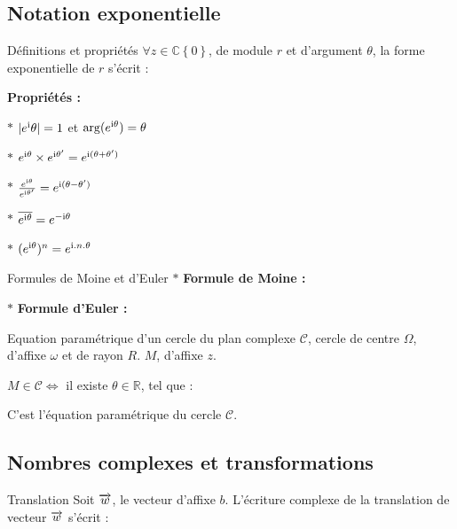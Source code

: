 \subsection{Notation exponentielle}

\begin{bclogo}{Définitions et propriétés}
$\forall z \in \mathbb{C} \left\lbrace 0\right\rbrace $, de module $r$ et d'argument $\theta$, la forme exponentielle de $r$ s'écrit :

\textbf{Propriétés :}

$\ast$ $|e^{\mathrm{i}} \theta|=1$ et $\arg (e^{\mathrm{i} \theta} )=\theta$
\medskip

$\ast$ $e^{\mathrm{i} \theta}\times e^{\mathrm{i} \theta '}=e^{\mathrm{i} (\theta +\theta ')}$
\medskip

$\ast$ $\frac{e^{\mathrm{i} \theta}}{e^{\mathrm{i} \theta '}}=e^{\mathrm{i} (\theta-\theta ')}$
\medskip

$\ast$ $\overline{e^{\mathrm{i} \theta}}=e^{-\mathrm{i} \theta}$
\medskip

$\ast$ $(e^{\mathrm{i} \theta})^n=e^{\mathrm{i} .n.\theta}$

\end{bclogo} 

\medskip

\begin{bclogo}{Formules de Moine et d'Euler}
$\ast$ \textbf{Formule de Moine :} 

$\ast$ \textbf{Formule d'Euler :} 
\end{bclogo}

\medskip

\begin{bclogo}{Equation paramétrique d'un cercle du plan complexe}
$\mathcal{C}$, cercle de centre $\Omega$, d'affixe $\omega$ et de rayon $R$. $M$, d'affixe $z$.

$M\in \mathcal{C} \Longleftrightarrow$ il existe $\theta \in \mathbb{R}$, tel que : 

C'est l'équation paramétrique du cercle $\mathcal{C}$.
\end{bclogo}

\subsection{Nombres complexes et transformations}
\begin{bclogo}{Translation}
Soit $\overrightarrow{w}$, le vecteur d'affixe $b$. L'écriture complexe de la translation de vecteur $\overrightarrow{w}$ s'écrit : 
\end{bclogo}

